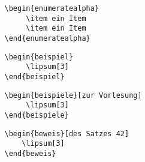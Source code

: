 			\begin{verbatim}
				\begin{enumeratealpha}
				     \item ein Item
				     \item ein Item
				\end{enumeratealpha}
			\end{verbatim}


			\newpage

			\begin{verbatim}
				\begin{beispiel}
				     \lipsum[3]
				\end{beispiel}
			\end{verbatim}


			\begin{verbatim}
				\begin{beispiele}[zur Vorlesung]
				     \lipsum[3]
				\end{beispiele}
			\end{verbatim}


			\begin{verbatim}
				\begin{beweis}[des Satzes 42]
				    \lipsum[3]
				\end{beweis}
			\end{verbatim}

